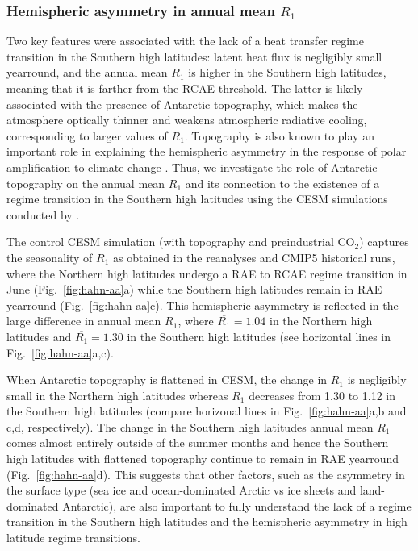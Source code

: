 \documentclass{ametsocV5}
\begin{document}
  \subsubsection{Hemispheric asymmetry in annual mean $R_1$}
  Two key features were associated with the lack of a heat transfer regime transition in the Southern high latitudes: latent heat flux is negligibly small yearround, and the annual mean $R_1$ is higher in the Southern high latitudes, meaning that it is farther from the RCAE threshold. The latter is likely associated with the presence of Antarctic topography, which makes the atmosphere optically thinner and weakens atmospheric radiative cooling, corresponding to larger values of $R_1$. Topography is also known to play an important role in explaining the hemispheric asymmetry in the response of polar amplification to climate change \citep{salzmann2017,hahn2020,singh2020}. Thus, we investigate the role of Antarctic topography on the annual mean $R_1$ and its connection to the existence of a regime transition in the Southern high latitudes using the CESM simulations conducted by \cite{hahn2020}. 
  

  The control CESM simulation (with topography and preindustrial CO$_2$) captures the seasonality of $R_1$ as obtained in the reanalyses and CMIP5 historical runs, where the Northern high latitudes undergo a RAE to RCAE regime transition in June (Fig.~\ref{fig:hahn-aa}a) while the Southern high latitudes remain in RAE yearround (Fig.~\ref{fig:hahn-aa}c). This hemispheric asymmetry is reflected in the large difference in annual mean $R_1$, where $\overline{R_1}=1.04$ in the Northern high latitudes and $\overline{R_1}=1.30$ in the Southern high latitudes (see horizontal lines in Fig.~\ref{fig:hahn-aa}a,c).

  When Antarctic topography is flattened in CESM, the change in $\overline{R_1}$ is negligibly small in the Northern high latitudes whereas $\overline{R_1}$ decreases from 1.30 to 1.12 in the Southern high latitudes (compare horizonal lines in Fig.~\ref{fig:hahn-aa}a,b and c,d, respectively). The change in the Southern high latitudes annual mean $R_1$ comes almost entirely outside of the summer months and hence the Southern high latitudes with flattened topography continue to remain in RAE yearround (Fig.~\ref{fig:hahn-aa}d). This suggests that other factors, such as the asymmetry in the surface type (sea ice and ocean-dominated Arctic vs ice sheets and land-dominated Antarctic), are also important to fully understand the lack of a regime transition in the Southern high latitudes and the hemispheric asymmetry in high latitude regime transitions.
\end{document}
